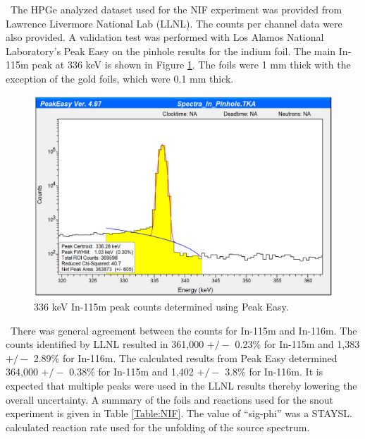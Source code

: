 \documentclass[journal]{IEEEtran}
\let\MYoriglatexcaption\caption
\renewcommand{\caption}[2][\relax]{\MYoriglatexcaption[#2]{#2}}
\begin{document}
	\ The HPGe analyzed dataset used for the NIF experiment was provided from Lawrence Livermore National Lab (LLNL). 
The counts per channel data were also provided. 
A validation test was performed with Los Alamos National Laboratory's Peak Easy on the pinhole results for the indium foil. %
The main In-115m peak at 336 keV is shown in Figure \ref{fig:peakez}. 
The foils were 1 mm thick with the exception of the gold foils, which were 0.1 mm thick. 
	
	\begin{figure}[h]
		\includegraphics[width=\linewidth]{Figures/PeakEZ.png}
		\caption{336 keV In-115m peak counts determined using Peak Easy.}
		\label{fig:peakez}
	\end{figure}
	\ There was general agreement between the counts for In-115m and In-116m. 
The counts identified by LLNL resulted in 361,000 $+/-$ 0.23\% for In-115m and 1,383 $+/-$ 2.89\% for In-116m. 
The calculated results from Peak Easy determined 364,000 $+/-$ 0.38\% for In-115m and 1,402 $+/-$ 3.8\% for In-116m. 
It is expected that multiple peaks were used in the LLNL results thereby lowering the overall uncertainty.
A summary of the foils and reactions used for the snout experiment is given in Table \ref{Table:NIF}. The value of ``sig-phi'' was a STAYSL. calculated reaction rate used for the unfolding of the source spectrum.
	
\end{document}
